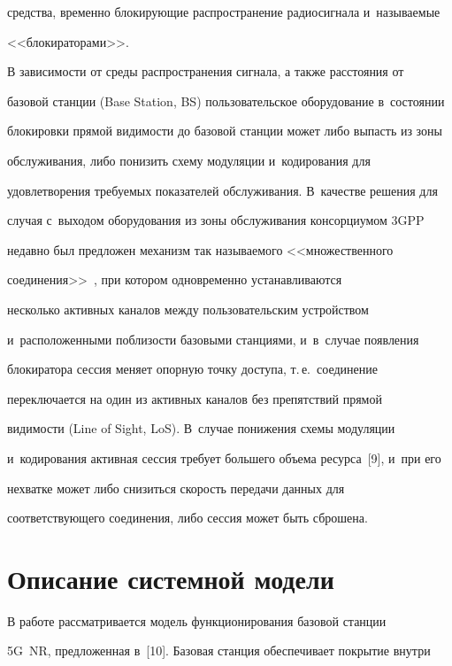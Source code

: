 средства, временно блокирующие распространение радиосигнала и~называемые 


<<блокираторами>>.


  


  В зависимости от среды распространения сигнала, а также расстояния от 


базовой станции (Base Station, BS) пользовательское оборудование в~состоянии 


блокировки прямой видимости до базовой станции может либо выпасть из зоны 


обслуживания, либо понизить схему модуляции и~кодирования для 


удовлетворения требуемых показателей обслуживания. В~качестве решения для 


случая с~выходом оборудования из зоны обслуживания консорциумом 3GPP 


недавно был предложен механизм так называемого <<множественного 


соединения>>~\cite{8-bs}, при котором одновременно устанавливаются 


несколько активных каналов между пользовательским устройством 


и~расположенными поблизости базовыми станциями, и~в~случае появления 


блокиратора сессия меняет опорную точку доступа, т.\,е.\ соединение 


переключается на один из активных каналов без препятствий прямой 


видимости (Line of Sight, LoS). В~случае понижения схемы модуляции 


и~кодирования активная сессия требует большего объема ресурса~[9], и~при его 


нехватке может либо снизиться скорость передачи данных для 


соответствующего соединения, либо сессия может быть сброшена.


  


\section{Описание системной модели }


  


  В работе рассматривается модель функционирования базовой станции 


5G~NR, предложенная в~[10]. Базовая станция обеспечивает покрытие внутри 


